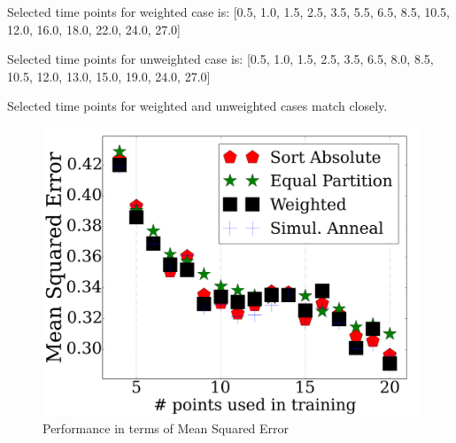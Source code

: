 \documentclass{article}
\begin{document}
Selected time points for weighted case is: [0.5, 1.0, 1.5, 2.5, 3.5, 5.5, 6.5, 8.5, 10.5, 12.0, 16.0, 18.0, 22.0, 24.0, 27.0]

Selected time points for unweighted case is: [0.5, 1.0, 1.5, 2.5, 3.5, 6.5, 8.0, 8.5, 10.5, 12.0, 13.0, 15.0, 19.0, 24.0, 27.0]

Selected time points for weighted and unweighted cases match closely.

\begin{figure}
\centering
\includegraphics[scale=0.4]{../avgplot.png}
\caption{Performance in terms of Mean Squared Error}
\label{fig:fig1}
\end{figure}



\end{document}
